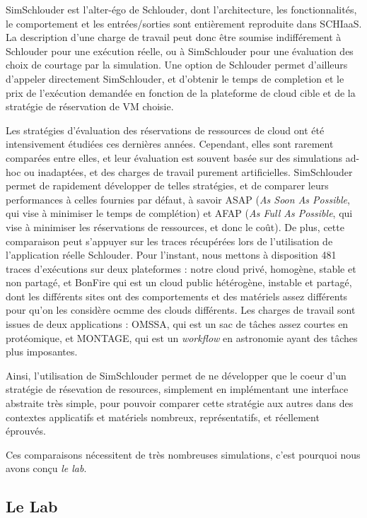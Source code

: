 \documentclass[parallelisme]{compas2017}
\begin{document}
SimSchlouder est l'alter-égo de Schlouder, dont l'architecture, les fonctionnalités, le comportement
et les entrées/sorties sont entièrement reproduite dans SCHIaaS. La description d'une charge de 
travail peut donc être soumise indifférement à Schlouder pour une exécution réelle, ou à SimSchlouder
pour une évaluation des choix de courtage par la simulation. Une option de Schlouder permet 
d'ailleurs d'appeler directement SimSchlouder, et d'obtenir le temps de completion et le prix 
de l'exécution demandée en fonction de la plateforme de cloud cible et de la stratégie de réservation
de VM choisie.

Les stratégies d'évaluation des réservations de ressources de cloud ont été intensivement étudiées 
ces dernières années. Cependant, elles sont rarement comparées entre elles, et leur évaluation 
est souvent basée sur des simulations ad-hoc ou inadaptées, et des charges de travail purement artificielles.
SimSchlouder permet de rapidement développer de telles stratégies, et de comparer leurs performances 
à celles fournies par défaut, à savoir ASAP (\textit{As Soon As Possible}, qui vise à minimiser le temps de 
complétion) et AFAP (\textit{As Full As Possible}, qui vise à minimiser les réservations de ressources,
et donc le coût). De plus, cette comparaison peut s'appuyer sur les traces récupérées lors de l'utilisation 
de l'application réelle Schlouder. Pour l'instant, nous mettons à disposition 481 traces d'exécutions
sur deux plateformes : notre cloud privé, homogène, stable et non partagé, et BonFire qui est un cloud 
public hétérogène, instable et partagé, dont les différents sites ont des comportements et des matériels 
assez différents pour qu'on les considère ocmme des clouds différents.
Les charges de travail sont issues de deux applications : OMSSA, qui est un sac de tâches assez courtes 
en protéomique, et MONTAGE, qui est un \textit{workflow} en astronomie ayant des tâches plus imposantes. 

Ainsi, l'utilisation de SimSchlouder permet de ne développer que le coeur d'un stratégie de résevation 
de resources, simplement en implémentant une interface abstraite très simple, pour pouvoir comparer cette 
stratégie aux autres dans des contextes applicatifs et matériels nombreux, représentatifs, et réellement 
éprouvés.

Ces comparaisons nécessitent de très nombreuses simulations, c'est pourquoi nous avons conçu \emph{le lab}.

\subsection{Le Lab}
\end{document}
